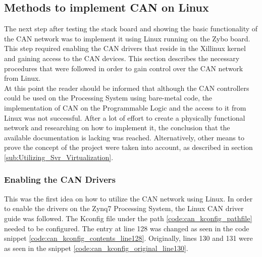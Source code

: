 \subsection{Methods to implement CAN on Linux}

The next step after testing the stack board and showing the basic functionality of the CAN network was to implement it using Linux running on the Zybo board.
This step required enabling the CAN drivers that reside in the Xillinux kernel and gaining access to the CAN devices.
This section describes the necessary procedures that were followed in order to gain control over the CAN network from Linux.
\\
At this point the reader should be informed that although the CAN controllers could be used on the Processing System using bare-metal code, the implementation of CAN on the Programmable Logic and the access to it from Linux was not successful.
After a lot of effort to create a physically functional network and researching on how to implement it, the conclusion that the available documentation is lacking was reached.
Alternatively, other means to prove the concept of the project were taken into account, as described in section \ref{sub:Utilizing_Svr_Virtualization}.

\subsubsection{Enabling the CAN Drivers}

This was the first idea on how to utilize the CAN network using Linux.
In order to enable the drivers on the Zynq7 Processing System, the Linux CAN driver guide \cite{Xilinx_wiki_Linux_CAN_driver} was followed.
The Kconfig file under the path \ref{code:can_kconfig_pathfile} needed to be configured.
The entry at line 128 was changed as seen in the code snippet \ref{code:can_kconfig_contents_line128}.
Originally, lines 130 and 131 were as seen in the snippet \ref{code:can_kconfig_original_line130}.

